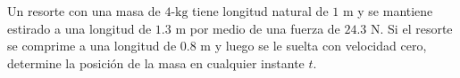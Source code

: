 \item Un resorte con una masa de $4\text{-kg}$ tiene longitud natural de $1 \text{ m}$ y se mantiene estirado a una longitud de $1.3 \text{ m}$ por medio de una fuerza de $24.3 \text{ N}$. Si el resorte se comprime a una longitud de $0.8 \text{ m}$ y luego se le suelta con velocidad cero, determine la posición de la masa en cualquier instante $t$.
